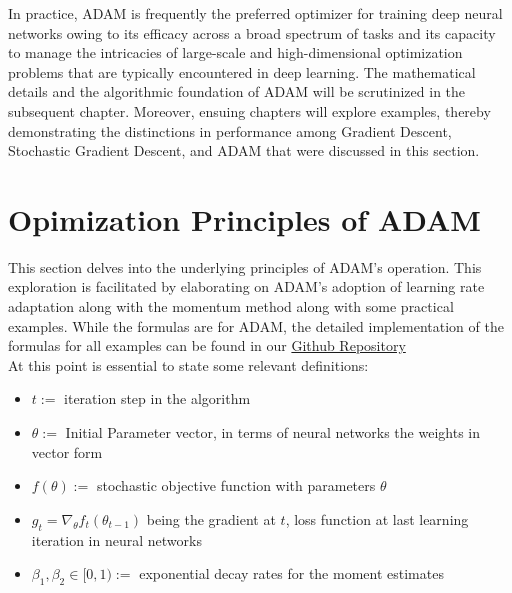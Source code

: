 \documentclass[journal]{IEEEtran}
\begin{document}
In practice, ADAM is frequently the preferred optimizer for training deep neural networks owing to its efficacy across a broad spectrum of tasks and its capacity to manage the intricacies of large-scale and high-dimensional optimization problems that are typically encountered in deep learning. The mathematical details and the algorithmic foundation of ADAM will be scrutinized in the subsequent chapter. Moreover, ensuing chapters will explore examples, thereby demonstrating the distinctions in performance among Gradient Descent, Stochastic Gradient Descent, and ADAM that were discussed in this section.


\section{Opimization Principles of ADAM}
This section delves into the underlying principles of ADAM's operation. This exploration is facilitated by elaborating on ADAM's adoption of learning rate adaptation along with the momentum method along with some practical examples. While the formulas are for ADAM, the detailed implementation of the formulas for all examples can be found in our \href{https://github.com/jakthehut/ADAM-Optimizer}{Github Repository}\\
At this point is essential to state some relevant definitions:
\begin{itemize}
    \item $t:=$ iteration step in the algorithm
    \item $\theta:=$ Initial Parameter vector, in terms of neural networks the weights in vector form
    \item $f(\theta):=$ stochastic objective function with parameters $\theta$
    \item $g_t= \nabla_{\theta} f_t(\theta_{t-1})$ being the gradient at $t$, loss function at last learning iteration in neural networks
    \item $\beta_1, \beta_2 \in [0,1) :=$ exponential decay rates for the moment estimates
\end{itemize}
\end{document}
